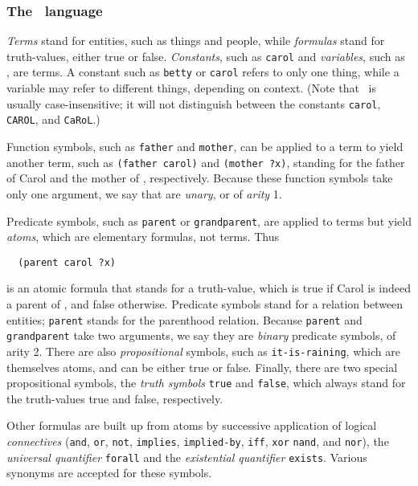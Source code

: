 \subsubsection{The \Snark\  language}


{\em Terms} stand for entities, such as things and people, while {\em
formulas} stand for truth-values, either true or false.  {\em Constants},
such as {\tt carol} and {\em variables}, such as
\varx\/, are terms.  A constant such as \verb'betty'
or \verb'carol'  refers to only one thing, while a variable may refer to
different things, depending on context.  (Note that \snark\  is usually
case-insensitive;  it will not distinguish between the constants
\verb'carol', \verb'CAROL', and \verb'CaRoL'.)

Function symbols, such as \verb'father' and \verb'mother', can be applied to
a term to yield another term, such as \verb'(father carol)' and
\verb'(mother ?x)', standing for the father of Carol and the mother of \varx\/,
respectively.  Because these function symbols take only one argument, we say
that are {\em unary}, or of {\em arity} 1.

Predicate symbols, such as \verb'parent' or \verb'grandparent', are applied
to terms but yield {\em atoms}, which are elementary formulas, not terms.
Thus
\begin{verbatim}
  (parent carol ?x)
\end{verbatim}
is an atomic formula that stands for a
truth-value, which is true if Carol is indeed a parent of \varx\/, and false
otherwise.  Predicate symbols stand for a relation between entities;
\verb'parent' stands for the parenthood relation.  Because \verb'parent' and
\verb'grandparent' take two arguments, we say they are {\em binary} predicate
symbols, of arity 2.  There are also {\em propositional} symbols, such as
{\tt it-is-raining}, which are themselves atoms, and can be either true or
false.  Finally, there are two special propositional symbols, the {\em truth
symbols}
\verb'true' and \verb'false', which always stand for the truth-values true
and false, respectively.


Other formulas are built up from atoms by successive application of
logical {\em connectives} (\verb'and', \verb'or', \verb'not',
\verb'implies',
\verb'implied-by', \verb'iff', {\tt xor} {\tt nand}, and {\tt nor}), the {\em universal quantifier}
\verb'forall' and the {\em existential quantifier} \verb'exists'.
Various synonyms are accepted for these symbols.

